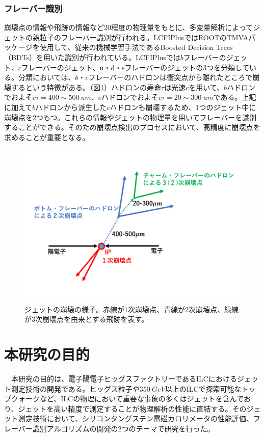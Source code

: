 \subsubsection{フレーバー識別}
崩壊点の情報や飛跡の情報など20程度の物理量をもとに、多変量解析によってジェットの親粒子のフレーバー識別が行われる。LCFIPlusではROOT\cite{root}のTMVA\cite{tmva}パッケージを使用して、従来の機械学習手法であるBoosted Decision Trees（BDTs）を用いた識別が行われている。LCFIPlusでは$b$フレーバーのジェット、$c$フレーバーのジェット、u・d・sフレーバーのジェットの3つを分類している。分類においては、$b$・$c$フレーバーのハドロンは衝突点から離れたところで崩壊するという特徴がある。（図\ref{bcjets}）ハドロンの寿命$\tau$は光速$c$を用いて、$b$ハドロンでおよそ$c\tau = 400 \sim \SI{500}{um}$、$c$ハドロンでおよそ$c\tau = 20 \sim \SI{300}{um}$である。上記に加えて$b$ハドロンから派生した$c$ハドロンも崩壊するため、1つのジェット中に崩壊点を2つもつ。これらの情報やジェットの物理量を用いてフレーバーを識別することができる。そのため崩壊点検出のプロセスにおいて、高精度に崩壊点を求めることが重要となる。
\begin{figure}[H]
	\begin{center}
 \includegraphics[keepaspectratio, scale=0.4]
 	{Figure/Introduction/bcjets.pdf}
 		\caption {ジェットの崩壊の様子。赤線が1次崩壊点、青線が2次崩壊点、緑線が3次崩壊点を由来とする飛跡を表す。}
 		\label{bcjets}
	\end{center}
\end{figure}
\section{本研究の目的}
　本研究の目的は、電子陽電子ヒッグスファクトリーであるILCにおけるジェット測定技術の開発である。ヒッグス粒子や$\SI{350}{GeV}$以上のILCで探索可能なトップクォークなど、ILCの物理において重要な事象の多くはジェットを含んでおり、ジェットを高い精度で測定することが物理解析の性能に直結する。そのジェット測定技術において、シリコンタングステン電磁カロリメータの性能評価、フレーバー識別アルゴリズムの開発の2つのテーマで研究を行った。\\
